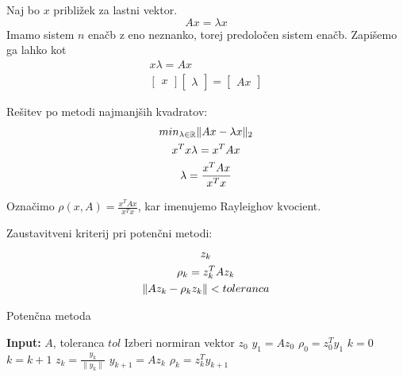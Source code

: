\documentclass[a4paper,12pt]{article}
\DeclarePairedDelimiter\norm{\lVert}{\rVert}
\theoremstyle{definition}
\theoremstyle{remark}
\newcommand{\R}{\mathbb{R}}
\begin{document}
Naj bo $x$ približek za lastni vektor.
\begin{equation*}
    Ax = \lambda x
\end{equation*}
Imamo sistem $n$ enačb z eno neznanko, torej predoločen sistem enačb. Zapišemo ga lahko kot
\begin{gather*} %
    x \lambda = A x \\
    \begin{bmatrix}
        x
    \end{bmatrix} \begin{bmatrix}
        \lambda
    \end{bmatrix} = \begin{bmatrix}
        Ax
    \end{bmatrix}
\end{gather*}

Rešitev po metodi najmanjših kvadratov:
\begin{gather*}
    min_{\lambda \in \R} \norm{Ax - \lambda x}_2 \\
    x^T x \lambda = x^T A x \\
    \lambda = \frac{x^T A x}{x^T x}
\end{gather*}

Označimo $\rho (x, A) = \frac{x^T A x}{x^T x}$, kar imenujemo Rayleighov kvocient.

Zaustavitveni kriterij pri potenčni metodi:
\begin{gather*}
    z_k \\
    \rho_k = z_k^T A z_k \\
    \norm{A z_k - \rho_k z_k} < toleranca
\end{gather*}



\begin{algorithm}
    \caption{Potenčna metoda}
    \begin{algorithmic}[1]
    \State \textbf{Input:} $A$, toleranca $tol$
    \State Izberi normiran vektor $z_0$
    \State $y_1 = A z_0$
    \State $\rho_0 = z_0^T y_1$
    \State $k = 0$
        \State $k = k + 1$
        \State $z_k = \frac{y_k}{\|y_k\|}$
        \State $y_{k+1} = A z_k$
        \State $\rho_k = z_k^T y_{k+1}$
    \EndWhile
    \end{algorithmic}
\end{algorithm}
\end{document}
